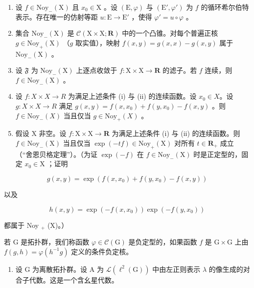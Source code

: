 \begin{enumerate}
\def\labelenumi{\alph{enumi})}
\setcounter{enumi}{2}
\item
  设 \(f \in \mathrm{Noy}_{-}(\mathrm{X})\) 且 \(x_0 \in \mathrm{X}\) 。设 \((\mathrm{E}, \varphi)\) 与 \((\mathrm{E}', \varphi')\) 为 \(f\) 的循环希尔伯特表示。存在唯一的仿射等距 \(u: \mathrm{E} \to \mathrm{E}'\) ，使得 \(\varphi' = u \circ \varphi\) 。
\item
  集合 \(\mathrm{Noy}_{-}(\mathrm{X})\) 是 \(\mathcal{C}(\mathrm{X}\times \mathrm{X};\mathbf{R})\) 中的一个凸锥。对每个普遍正核 \(g\in \mathrm{Noy}_{+}(\mathrm{X})\) （\(g\) 取实值），映射 \(f(x,y) = g(x,x) - g(x,y)\) 属于 \(\mathrm{Noy}_{-}(\mathrm{X})\) 。
\item
  设 \(\mathfrak{F}\) 为 \(\mathrm{Noy}_{-}(\mathrm{X})\) 上逐点收敛于 \(f\colon \mathrm{X}\times \mathrm{X}\to \mathbf{R}\) 的滤子。若 \(f\) 连续，则 \(f\in \mathrm{Noy}_{-}(\mathrm{X})\) 。
\item
  设 \(f: X \times X \to R\) 为满足上述条件 (i) 与 (ii) 的连续函数。设 \(x_{0} \in X\)。设 \(g: X \times X \to R\) 满足 \(g(x, y) = f(x, x_{0}) + f(y, x_{0}) - f(x, y)\) 。则 \(f \in \text{Noy}_{-}(X)\) 当且仅当 \(g \in \text{Noy}_{+}(X)\) 。
\item
  假设 X 非空。设 \(f: \mathrm{X} \times \mathrm{X} \to \mathbf{R}\) 为满足上述条件 (i) 与 (ii) 的连续函数。则 \(f \in \mathrm{Noy}_{-}(\mathrm{X})\) 当且仅当 \(\exp(-tf) \in \mathrm{Noy}_{+}(\mathrm{X})\) 对所有 \(t \in \mathbf{R}_{+}\) 成立（“舍恩贝格定理”）。（为证 \(\exp(-f)\) 在 \(f \in \mathrm{Noy}_{-}(\mathrm{X})\) 时是正定型的，固定 \(x_0 \in \mathrm{X}\) ；证明
\end{enumerate}

\[
g (x, y) = \exp (f (x, x _ {0}) + f (y, x _ {0}) - f (x, y))
\]

以及

\[
h (x, y) = \exp (- f (x, x _ {0})) \exp (- f (y, x _ {0}))
\]

都属于 Noy \(_{+}\) (X)。）

若 G 是拓扑群，我们称函数 \(\varphi \in \mathcal{C}(\mathrm{G})\) 是负定型的，如果函数 \(f\) 是 \(\mathrm{G} \times \mathrm{G}\) 上由 \(f(g,h) = \varphi(h^{-1}g)\) 定义的条件负定核。

\begin{enumerate}
\def\labelenumi{\arabic{enumi})}
\setcounter{enumi}{5}
\tightlist
\item
  设 G 为离散拓扑群。设 A 为 \(\mathcal{L}(\ell^{2}(\mathrm{G}))\) 中由左正则表示 \(\lambda\) 的像生成的对合子代数。这是一个含幺星代数。
\end{enumerate}

